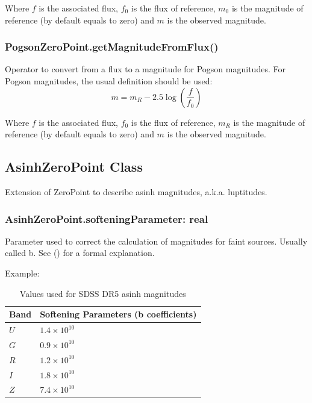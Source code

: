 \documentclass[11pt,a4paper]{ivoa}
\begin{document}
Where $f$ is the associated flux, $f_0$ is the flux of reference, $m_0$ is 
the magnitude of reference (by default equals to zero) and $m$ is the 
observed magnitude.
\par

\subsubsection{PogsonZeroPoint.getMagnitudeFromFlux()}
Operator to convert from a flux to a magnitude for Pogson magnitudes. 
For Pogson magnitudes, the usual definition should be used:
\begin{equation} \label{eq:26}
m = m_R - 2.5\log(\frac{f}{f_0 })
\end{equation}

Where $f$ is the associated flux, $f_0$ is the flux of reference, 
$m_R$ is the magnitude of reference (by default equals to zero) and 
$m$ is the observed magnitude.
\par

\subsection{AsinhZeroPoint Class}
Extension of ZeroPoint  to describe asinh magnitudes, a.k.a. luptitudes.
\par

\subsubsection{AsinhZeroPoint.softeningParameter: real}
Parameter used to correct the calculation of magnitudes for faint 
sources. Usually called b. See (\citep{1999AJ....118.1406L}) for 
a formal explanation.
\par

Example:
\par


\begin{table}[ht]
\centering
    \begin{tabular}{m{2.7cm}m{8cm}}
	\hline %
Band & Softening Parameters (b coefficients) \\
\hline
 $U$ & $1.4 \times 10^{10}$ \\
 $G$ & $0.9 \times 10^{10}$ \\
 $R$ & $1.2 \times 10^{10}$ \\
 $I$ & $1.8 \times 10^{10}$ \\
 $Z$ & $7.4 \times 10^{10}$ \\
\hline
\end{tabular}
\caption{Values used for SDSS DR5 asinh magnitudes}

\end{table}
\end{document}

